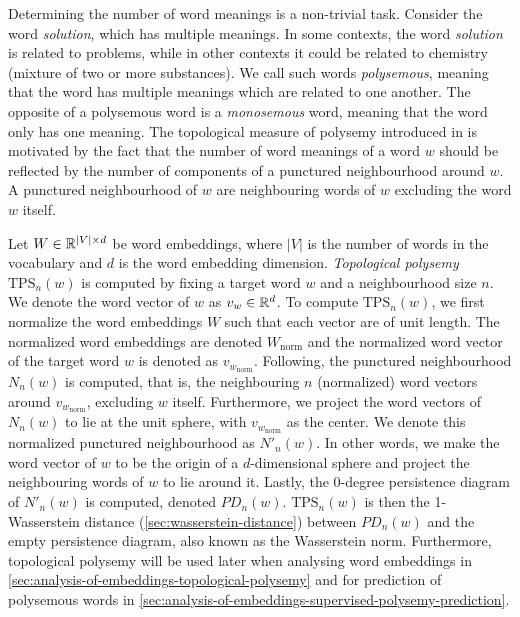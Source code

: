 Determining the number of word meanings is a non-trivial task. Consider the word \textit{solution}, which has multiple meanings. In some contexts, the word \textit{solution} is related to problems, while in other contexts it could be related to chemistry (mixture of two or more substances). We call such words \textit{polysemous}, meaning that the word has multiple meanings which are related to one another. The opposite of a polysemous word is a \textit{monosemous} word, meaning that the word only has one meaning. The topological measure of polysemy introduced in \cite{jakubowski2020topology} is motivated by the fact that the number of word meanings of a word $w$ should be reflected by the number of components of a punctured neighbourhood around $w$. A punctured neighbourhood of $w$ are neighbouring words of $w$ excluding the word $w$ itself.

Let $W \in \mathbb{R}^{|V| \times d}$ be word embeddings, where $|V|$ is the number of words in the vocabulary and $d$ is the word embedding dimension. \textit{Topological polysemy} $\text{TPS}_n(w)$ is computed by fixing a target word $w$ and a neighbourhood size $n$. We denote the word vector of $w$ as $v_w \in \mathbb{R}^{d}$. To compute $\text{TPS}_n(w)$, we first normalize the word embeddings $W$ such that each vector are of unit length. The normalized word embeddings are denoted $W_\text{norm}$ and the normalized word vector of the target word $w$ is denoted as $v_{w_{\text{norm}}}$. Following, the punctured neighbourhood $N_n(w)$ is computed, that is, the neighbouring $n$ (normalized) word vectors around $v_{w_{\text{norm}}}$, excluding $w$ itself. Furthermore, we project the word vectors of $N_n(w)$ to lie at the unit sphere, with $v_{w_{\text{norm}}}$ as the center. We denote this normalized punctured neighbourhood as $N'_n(w)$. In other words, we make the word vector of $w$ to be the origin of a $d$-dimensional sphere and project the neighbouring words of $w$ to lie around it. Lastly, the 0-degree persistence diagram of $N'_n(w)$ is computed, denoted $PD_n(w)$. $\text{TPS}_n(w)$ is then the 1-Wasserstein distance (\cref{sec:wasserstein-distance}) between $PD_n(w)$ and the empty persistence diagram, also known as the Wasserstein norm. Furthermore, topological polysemy will be used later when analysing word embeddings in \cref{sec:analysis-of-embeddings-topological-polysemy} and for prediction of polysemous words in \cref{sec:analysis-of-embeddings-supervised-polysemy-prediction}.

